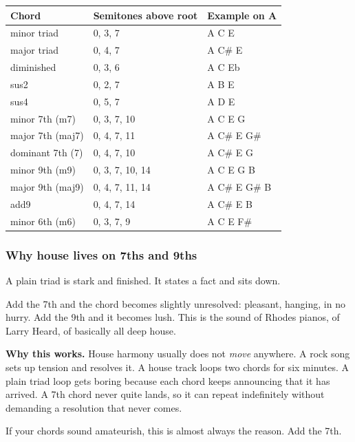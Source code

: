 {\def\LTcaptype{none} %
\begin{longtable}[]{@{}lll@{}}
\toprule\noalign{}
Chord & Semitones above root & Example on A \\
\midrule\noalign{}
\endhead
\bottomrule\noalign{}
\endlastfoot
minor triad & 0, 3, 7 & A C E \\
major triad & 0, 4, 7 & A C\# E \\
diminished & 0, 3, 6 & A C Eb \\
sus2 & 0, 2, 7 & A B E \\
sus4 & 0, 5, 7 & A D E \\
minor 7th (m7) & 0, 3, 7, 10 & A C E G \\
major 7th (maj7) & 0, 4, 7, 11 & A C\# E G\# \\
dominant 7th (7) & 0, 4, 7, 10 & A C\# E G \\
minor 9th (m9) & 0, 3, 7, 10, 14 & A C E G B \\
major 9th (maj9) & 0, 4, 7, 11, 14 & A C\# E G\# B \\
add9 & 0, 4, 7, 14 & A C\# E B \\
minor 6th (m6) & 0, 3, 7, 9 & A C E F\# \\
\end{longtable}
}

\subsubsection{Why house lives on 7ths and 9ths}\label{th04_harmony-why-house-lives-on-7ths-and-9ths}

A plain triad is stark and finished. It states a fact and sits down.

Add the 7th and the chord becomes slightly unresolved: pleasant, hanging, in no hurry. Add
the 9th and it becomes lush. This is the sound of Rhodes pianos, of Larry Heard, of
basically all deep house.

\begin{intuitionbox}
\textbf{Why this works.} House harmony usually does not \emph{move} anywhere. A rock song sets up
tension and resolves it. A house track loops two chords for six minutes. A plain triad loop
gets boring because each chord keeps announcing that it has arrived. A 7th chord never quite
lands, so it can repeat indefinitely without demanding a resolution that never comes.
\end{intuitionbox}

If your chords sound amateurish, this is almost always the reason. Add the 7th.

